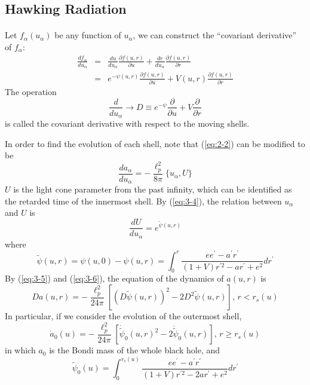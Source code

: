 \documentclass[letterpaper,12pt]{article}
\begin{document}
\subsection{Hawking Radiation}\label{sec:3-2}
\paragraph{ }
Let $f_{\alpha}(u_{\alpha})$ be any function of $u_{\alpha}$, we can construct the ``covariant derivative'' of $f_{\alpha}$:
\begin{eqnarray}
  \frac{df_{\alpha}}{du_{\alpha}} &=& \frac{du}{du_{\alpha}}\frac{\partial f(u,r)}{\partial u}+ \frac{dr}{du_{\alpha}}\frac{\partial f(u,r)}{\partial r}\\
  &=& e^{-\psi(u,r)}\frac{\partial f(u,r)}{\partial u}+V(u,r)\frac{\partial f(u,r)}{\partial r}
\end{eqnarray}
The operation
\begin{equation}
\frac{d}{du_{\alpha}} \rightarrow D \equiv e^{-\psi}\frac{\partial}{\partial u} + V\frac{\partial}{\partial r}
\end{equation}
is called the covariant derivative with respect to the moving shells.

In order to find the evolution of each shell, note that (\ref{eq:2-2}) can be modified to be
\begin{equation}\label{eq:3-5}
\frac{da_{\alpha}}{du_{\alpha}}=-\frac{\ell_{p}^{2}}{8\pi}\{u_{\alpha},U \}
\end{equation}
$U$ is the light cone parameter from the past infinity\cite{ho2016asymptotic}, which can be identified as the retarded time of the innermost shell. By (\ref{eq:3-4}), the relation between $u_{\alpha}$ and $U$ is
\begin{equation}\label{eq:3-6}
\frac{dU}{du_{\alpha}} = e^{\tilde{\psi}(u,r)}
\end{equation}
where
\begin{equation}\label{eq:3-12}
\tilde{\psi}(u,r) = \psi(u,0) -\psi(u, r) = \int^{r}_{0}\frac{ee^{\prime}-a^{\prime}r^{\prime}}{(1+V)r^{\prime 2}-ar^{\prime}+e^2}dr^{\prime}
\end{equation}
By (\ref{eq:3-5}) and (\ref{eq:3-6}), the equation of the dynamics of $a(u,r)$ is
\begin{equation}\label{eq:3-8}
Da(u,r) = -\frac{\ell_{p}^{2}}{24\pi}\left[(D\tilde{\psi}(u,r))^{2}-2D^{2}\tilde{\psi}(u,r)\right] \textrm{, }r<r_{s}(u)
\end{equation}
In particular, if we consider the evolution of the outermost shell,
\begin{equation}\label{eq:3-9}
\dot{a}_{0}(u) =  -\frac{\ell_{p}^{2}}{24\pi}\left[\dot{\tilde{\psi}}_{0}(u,r)^{2}-2\ddot{\tilde{\psi}}_{0}(u,r)\right]\textrm{, }r\geq r_{s}(u)
\end{equation}
in which $a_{0}$ is the Bondi mass of the whole black hole, and
\begin{equation}\label{eq:3-14}
\tilde{\psi}_{0}(u) = \int^{r_{s}(u)}_{0}\frac{ee^{\prime}-a^{\prime}r^{\prime}}{(1+V)r^{\prime 2}-2ar^{\prime}+e^2}dr^{\prime}
\end{equation}
\end{document}
